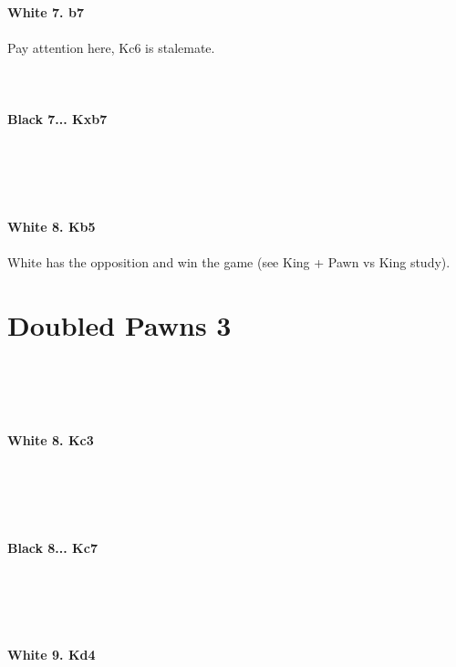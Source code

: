 \documentclass{article}
\begin{document}
\\
\textbf{White 7. b7}\\
\\
Pay attention here, Kc6 is stalemate.\\
\\

\\
\\
\textbf{Black 7... Kxb7}\\
\\
\\
\\

\\
\\
\textbf{White 8. Kb5}\\
\\
White has the opposition and win the game (see King + Pawn vs King study).\section{ Doubled Pawns 3}

\\
\\

\\
\\
\textbf{White 8. Kc3}\\
\\
\\
\\

\\
\\
\textbf{Black 8... Kc7}\\
\\
\\
\\

\\
\\
\textbf{White 9. Kd4}\\
\\
\\
\\

\\
\end{document}
